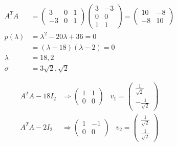 \begin{align}
    A^T A &= \begin{pmatrix}
        3 & 0 & 1 \\ -3 & 0 & 1
    \end{pmatrix} \begin{pmatrix}
        3 & -3 \\ 0 & 0 \\ 1 & 1 
    \end{pmatrix} = \begin{pmatrix}
        10 & -8 \\ -8 & 10
    \end{pmatrix} \\
    p(\lambda) &= \lambda^2 - 20 \lambda + 36 = 0 \\
    &= (\lambda - 18)(\lambda - 2) = 0 \\
    \lambda &= 18, 2 \\
    \sigma &= 3\sqrt{2}, \sqrt{2}
\end{align}

\begin{align}
    A^T A - 18 I_2 &\Rightarrow \begin{pmatrix}
        1 & 1 \\ 0 & 0
    \end{pmatrix} \;\;\; v_1 = \begin{pmatrix}
        \frac{1}{\sqrt{2}} \\ -\frac{1}{\sqrt{2}}
    \end{pmatrix} \\
    A^T A - 2 I_2 &\Rightarrow \begin{pmatrix}
        1 & -1 \\ 0 & 0
    \end{pmatrix} \;\;\; v_2 = \begin{pmatrix}
        \frac{1}{\sqrt{2}} \\ \frac{1}{\sqrt{2}}
    \end{pmatrix}
\end{align}

